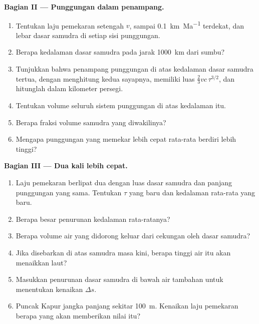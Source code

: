 \begin{problem}
\noindent\textbf{Bagian II --- Punggungan dalam penampang.}
\begin{enumerate}[resume]
  \item Tentukan laju pemekaran setengah $v$, sampai \qty{0.1}{km.Ma^{-1}} terdekat, dan lebar
        dasar samudra di setiap sisi punggungan.
  \item Berapa kedalaman dasar samudra pada jarak \qty{1000}{km} dari sumbu?
  \item Tunjukkan bahwa penampang punggungan di atas kedalaman dasar samudra tertua, dengan menghitung
        kedua sayapnya, memiliki luas $\tfrac23 v c\,\tau^{3/2}$, dan hitunglah dalam
        kilometer persegi.
  \item Tentukan volume seluruh sistem punggungan di atas kedalaman itu.
  \item Berapa fraksi volume samudra yang diwakilinya?
  \item Mengapa punggungan yang memekar lebih cepat rata-rata berdiri lebih tinggi?
\end{enumerate}

\noindent\textbf{Bagian III --- Dua kali lebih cepat.}
\begin{enumerate}[resume]
  \item Laju pemekaran berlipat dua dengan luas dasar samudra dan panjang punggungan yang sama. Tentukan $\tau$ yang baru
        dan kedalaman rata-rata yang baru.
  \item Berapa besar penurunan kedalaman rata-ratanya?
  \item Berapa volume air yang didorong keluar dari cekungan oleh dasar samudra?
  \item Jika disebarkan di atas samudra masa kini, berapa tinggi air itu akan menaikkan laut?
  \item Masukkan penurunan dasar samudra di bawah air tambahan untuk menentukan kenaikan $\Delta s$.
  \item Puncak Kapur jangka panjang sekitar \qty{100}{m}. Kenaikan laju pemekaran berapa
        yang akan memberikan nilai itu?
\end{enumerate}


\end{problem}
